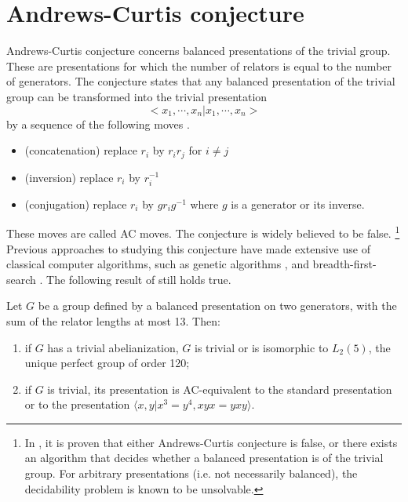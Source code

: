 
\section{Andrews-Curtis conjecture\label{sec:AC}}

Andrews-Curtis conjecture concerns balanced presentations
of the trivial group.
These are presentations for which the number of relators is
equal to the number of generators.
The conjecture states that any balanced presentation of
the trivial group can be transformed into the trivial presentation $$<x_1, \cdots, x_n | x_1, \cdots, x_n >$$ by
a sequence of the following moves \cite{Andrews-Curtis}.

\begin{itemize}
	\item (concatenation) replace $r_i$ by $r_i r_j$ for $i \neq j$
	\item (inversion) replace $r_i$ by $r_i^{-1}$
	\item (conjugation) replace $r_i$ by $g r_i g^{-1}$ where $g$ is a generator or its inverse.
\end{itemize}

These moves are called AC moves.
The conjecture is widely believed to be false.
\footnote{In \cite{decidability}, it is proven that either Andrews-Curtis conjecture is false, or there exists an algorithm that decides whether a balanced presentation is of the trivial group.
For arbitrary presentations (i.e. not necessarily balanced), the decidability problem is known to be unsolvable.
}
Previous approaches to studying this conjecture have made extensive use of classical computer algorithms, such as genetic algorithms \cite{genetic}, and breadth-first-search  \cite{bfs-ac}.
The following result of \cite{bfs-ac} still holds true.

\begin{theorem}
	Let $G$ be a group defined by a balanced presentation on two generators, with the sum
	of the relator lengths at most 13.
	Then:
	\begin{enumerate}[label=(\roman*)]
		\item if $G$ has a trivial abelianization, $G$ is trivial or is isomorphic to $L_2(5)$, the unique perfect
		group of order 120;
		\item if $G$ is trivial, its presentation is AC-equivalent to the standard presentation or to the presentation
		$\langle x, y | x^3 = y^4, xyx = yxy \rangle$.
	\end{enumerate}
\end{theorem}

